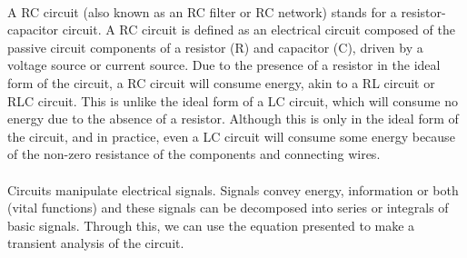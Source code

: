 \paragraph{}
A RC circuit (also known as an RC filter or RC network) stands for a resistor-capacitor circuit. A RC circuit is defined as an electrical circuit composed of the passive circuit components of a resistor (R) and capacitor (C), driven by a voltage source or current source.
Due to the presence of a resistor in the ideal form of the circuit, a RC circuit will consume energy, akin to a RL circuit or RLC circuit.
This is unlike the ideal form of a LC circuit, which will consume no energy due to the absence of a resistor. Although this is only in the ideal form of the circuit, and in practice, even a LC circuit will consume some energy because of the non-zero resistance of the components and connecting wires.

\paragraph{}
Circuits manipulate electrical signals. Signals convey energy, information or both (vital functions) and these signals can be decomposed into series or
integrals of basic signals. Through this, we can use the equation presented to make a transient analysis of the circuit.
